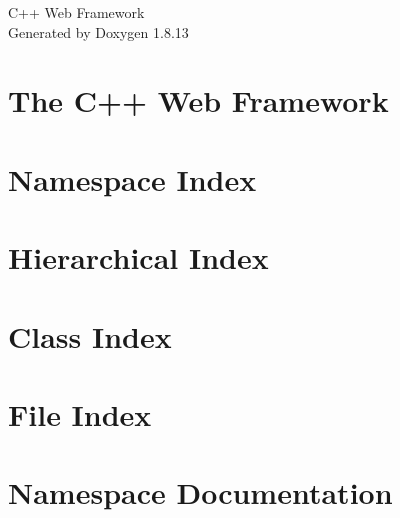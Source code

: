\documentclass[twoside]{book}
\newcommand{\+}{\discretionary{\mbox{\scriptsize$\hookleftarrow$}}{}{}}
\newcommand{\clearemptydoublepage}{%
  \newpage{\pagestyle{empty}\cleardoublepage}%
}
\begin{document}
\hypersetup{pageanchor=false,
             bookmarksnumbered=true,
             pdfencoding=unicode
            }
\begin{titlepage}
\vspace*{7cm}
\begin{center}%
{\Large C++ Web Framework }\\
\vspace*{1cm}
{\large Generated by Doxygen 1.8.13}\\
\end{center}
\end{titlepage}
\clearemptydoublepage
{}
\tableofcontents
\clearemptydoublepage
{}
\hypersetup{pageanchor=true}

\chapter{The C++ Web Framework}
\label{index}\hypertarget{index}{}
\chapter{Namespace Index}

\chapter{Hierarchical Index}

\chapter{Class Index}

\chapter{File Index}

\chapter{Namespace Documentation}















\end{document}
